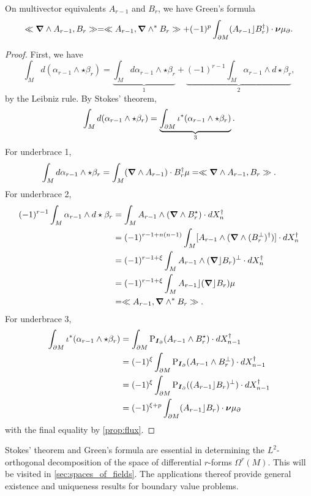 \begin{proposition}
On multivector equivalents $A_{r-1}$ and $B_r$, we have Green's formula
\begin{equation}
\ll \boldsymbol{\nabla} \wedge A_{r-1}, B_r\gg = \ll A_{r-1}, \boldsymbol{\nabla} \wedge^* B_r\gg + (-1)^{p} \int_{\partial M} (A_{r-1}\rfloor B_r^\dagger) \cdot \boldsymbol{\nu} \mu_\partial.
\end{equation}
\end{proposition}
\begin{proof}
First, we have
\begin{equation}
\int_M d(\alpha_{r-1} \wedge \star \beta_r) = \underbrace{\int_M d\alpha_{r-1} \wedge \star \beta_r}_{1} + \underbrace{(-1)^{r-1} \int_M \alpha_{r-1} \wedge d \star \beta_r}_{2},
\end{equation} 
by the Leibniz rule. By Stokes' theorem,
\begin{equation}
\int_M d(\alpha_{r-1} \wedge \star \beta_r) = \underbrace{\int_{\partial M} \iota^*(\alpha_{r-1} \wedge \star \beta_r)}_{3}.
\end{equation}
For underbrace 1,
\begin{equation}
\int_M d\alpha_{r-1} \wedge \star \beta_r = \int_M (\boldsymbol{\nabla} \wedge A_{r-1}) \cdot B_r^\dagger \mu = \ll \boldsymbol{\nabla} \wedge A_{r-1}, B_r\gg.
\end{equation}
For underbrace 2,
\begin{align}
    (-1)^{r-1}\int_M \alpha_{r-1} \wedge d \star \beta_r  &= \int_M A_{r-1} \wedge (\boldsymbol{\nabla} \wedge B_r^\star) \cdot dX_n^\dagger\\
    &= (-1)^{r-1+n(n-1)} \int_M [A_{r-1} \wedge (\boldsymbol{\nabla} \wedge (B_r^\perp)^\dagger)] \cdot dX_n^\dagger\\
    &= (-1)^{r-1 + \xi} \int_M A_{r-1} \wedge (\boldsymbol{\nabla} \rfloor B_r)^\perp \cdot dX_n^\dagger\\
    &= (-1)^{r-1 + \xi} \int_M A_{r-1} \rfloor (\boldsymbol{\nabla} \rfloor B_r) \mu\\
    &= \ll A_{r-1}, \boldsymbol{\nabla} \wedge^* B_r\gg.
\end{align}
For underbrace 3,
\begin{align}
\int_{\partial M} \iota^*(\alpha_{r-1} \wedge \star \beta_r) &= \int_{\partial M} \operatorname{P}_{\boldsymbol{I}_\partial} (A_{r-1} \wedge B_r^\star) \cdot dX_{n-1}^\dagger\\
&= (-1)^{\xi} \int_{\partial M} \operatorname{P}_{\boldsymbol{I}_\partial} (A_{r-1} \wedge B_r^\perp) \cdot dX_{n-1}^\dagger\\
&= (-1)^{\xi} \int_{\partial M} \operatorname{P}_{\boldsymbol{I}_\partial}( (A_{r-1} \rfloor B_r)^\perp) \cdot dX_{n-1}^\dagger\\
&= (-1)^{\xi+p} \int_{\partial M} (A_{r-1}\rfloor B_r) \cdot \boldsymbol{\nu} \mu_\partial 
\end{align}
with the final equality by \cref{prop:flux}.
\end{proof}
Stokes' theorem and Green's formula are essential in determining the $L^2$-orthogonal decomposition of the space of differential $r$-forms $\Omega^r(M)$. This will be visited in \cref{sec:spaces_of_fields}. The applications thereof provide general existence and uniqueness results for boundary value problems.

